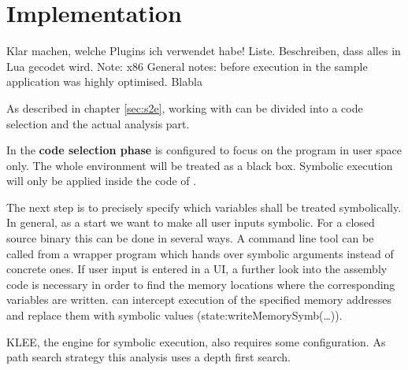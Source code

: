 \section{Implementation}\label{sec:impl}

Klar machen, welche Plugins ich verwendet habe! Liste. Beschreiben, dass alles in Lua gecodet wird. Note: x86
General notes: before execution in \sse the sample application \app was highly optimised.
Blabla

As described in chapter \ref{sec:s2e}, working with \sse can be divided into a code selection and the actual analysis part.

In the \textbf{code selection phase} \sse is configured to focus on the program \app in user space only.
The whole environment will be treated as a black box.
Symbolic execution will only be applied inside the code of \app.

The next step is to precisely specify which variables shall be treated symbolically.
In general, as a start we want to make all user inputs symbolic.
For a closed source binary this can be done in several ways.
A command line tool can be called from a wrapper program which hands over symbolic arguments instead of concrete ones.
If user input is entered in a UI, a further look into the assembly code is necessary in order to find the memory locations where the corresponding variables are written.
\sse can intercept execution of the specified memory addresses and replace them with symbolic values (state:writeMemorySymb(\ldots)).

KLEE, the engine for symbolic execution, also requires some configuration.
As path search strategy this analysis uses a depth first search.

